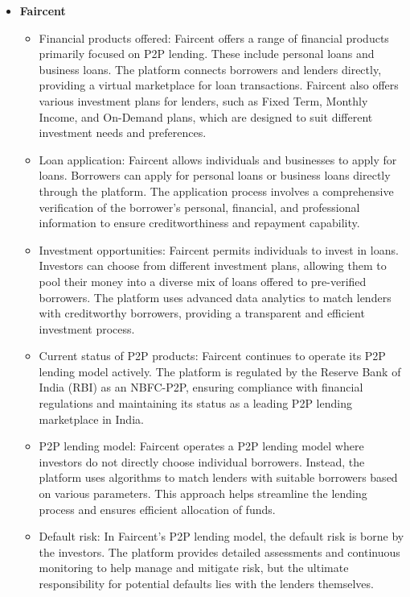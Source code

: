 \documentclass{article}
\begin{document}
\begin{itemize}
    \item \textbf{Faircent}
        \begin{itemize}
            \item Financial products offered: Faircent offers a range of financial products primarily focused on P2P lending. These include personal loans and business loans. The platform connects borrowers and lenders directly, providing a virtual marketplace for loan transactions. Faircent also offers various investment plans for lenders, such as Fixed Term, Monthly Income, and On-Demand plans, which are designed to suit different investment needs and preferences.
            \item Loan application: Faircent allows individuals and businesses to apply for loans. Borrowers can apply for personal loans or business loans directly through the platform. The application process involves a comprehensive verification of the borrower’s personal, financial, and professional information to ensure creditworthiness and repayment capability.
            \item Investment opportunities: Faircent permits individuals to invest in loans. Investors can choose from different investment plans, allowing them to pool their money into a diverse mix of loans offered to pre-verified borrowers. The platform uses advanced data analytics to match lenders with creditworthy borrowers, providing a transparent and efficient investment process.
            \item Current status of P2P products: Faircent continues to operate its P2P lending model actively. The platform is regulated by the Reserve Bank of India (RBI) as an NBFC-P2P, ensuring compliance with financial regulations and maintaining its status as a leading P2P lending marketplace in India.
            \item P2P lending model: Faircent operates a P2P lending model where investors do not directly choose individual borrowers. Instead, the platform uses algorithms to match lenders with suitable borrowers based on various parameters. This approach helps streamline the lending process and ensures efficient allocation of funds.
            \item Default risk: In Faircent’s P2P lending model, the default risk is borne by the investors. The platform provides detailed assessments and continuous monitoring to help manage and mitigate risk, but the ultimate responsibility for potential defaults lies with the lenders themselves.
        \end{itemize}  
    
\end{itemize}
\end{document}
